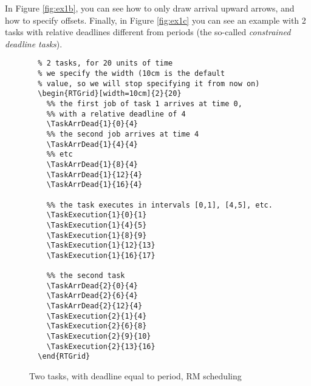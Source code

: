 \documentclass{article}
\begin{document}
In Figure \ref{fig:ex1b}, you can see how to only draw arrival upward
arrows, and how to specify offsets. Finally, in Figure \ref{fig:ex1c}
you can see an example with 2 tasks with relative deadlines different
from periods (the so-called \emph{constrained deadline tasks}).

\begin{figure}[!htbp]
  \centering
  \begin{RTGrid}[width=10cm]{2}{20}


  \end{RTGrid}
\begin{verbatim}
  % 2 tasks, for 20 units of time
  % we specify the width (10cm is the default
  % value, so we will stop specifying it from now on)
  \begin{RTGrid}[width=10cm]{2}{20}
    %% the first job of task 1 arrives at time 0, 
    %% with a relative deadline of 4 
    \TaskArrDead{1}{0}{4}     
    %% the second job arrives at time 4
    \TaskArrDead{1}{4}{4}
    %% etc
    \TaskArrDead{1}{8}{4}
    \TaskArrDead{1}{12}{4}
    \TaskArrDead{1}{16}{4}

    %% the task executes in intervals [0,1], [4,5], etc.
    \TaskExecution{1}{0}{1}
    \TaskExecution{1}{4}{5}
    \TaskExecution{1}{8}{9}
    \TaskExecution{1}{12}{13}
    \TaskExecution{1}{16}{17}

    %% the second task
    \TaskArrDead{2}{0}{4}
    \TaskArrDead{2}{6}{4}
    \TaskArrDead{2}{12}{4}
    \TaskExecution{2}{1}{4}
    \TaskExecution{2}{6}{8}
    \TaskExecution{2}{9}{10}
    \TaskExecution{2}{13}{16}
  \end{RTGrid}
\end{verbatim}
  \caption{Two tasks, with deadline equal to period, RM scheduling}
  \label{fig:ex1}
\end{figure}
\end{document}

